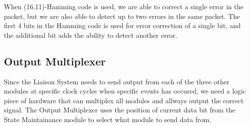 When (16,11)-Hamming code is used, we are able to correct a single
error in the packet, but we are also able to detect up to two errors
in the same packet.  The first 4 bits in the Hamming code is used for
error correction of a single bit, and the additional bit adds the
ability to detect another error.

\subsection{Output Multiplexer}
Since the Liaison System needs to send output from each of the three other modules at specific clock cycles when specific events has occured, we need
a logic piece of hardware that can multiplex all modules and allways output the correct signal. The Output Multiplexer uses the position of current data bit
from the State Maintainance module to select what module to send data from.
